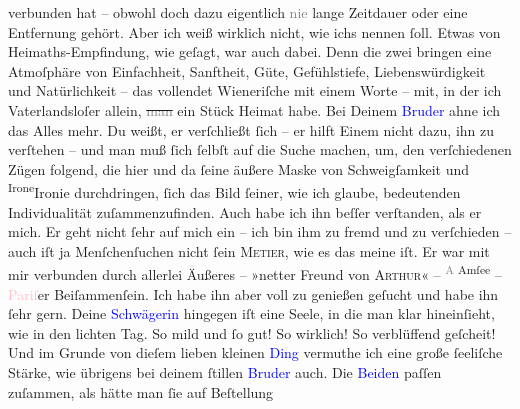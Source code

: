 \documentclass[twoside=false,titlepage=false,open=any, parskip=never, fontsize=12pt, headings=small, chapterprefix=false, appendixprefix=false]{scrbook}
\newcommand{\strikeout}[1]{\sout{#1}}
\newcommand{\Theight}{\dimexpr\fontcharht\font`W}
\newcommand{\pbposition}{\depth}
\newcommand{\pb}{\nobreak\hspace{0pt}\raisebox{-0.1em}{\raisebox{\pbposition}{\textnormal{|}}}\nobreak\hspace{0pt}}
\newcommand{\substVorne}{\textnormal{\raisebox{\Theight}{\raisebox{-\height}{\rotatebox[origin=c]{180}{v}\normalsize}}}}
\newcommand{\substDazwischen}{}
\newcommand{\substHinten}{\textnormal{\raisebox{\Theight}{\raisebox{-\height}{\small{v}\normalsize}}}}
\begin{document}
               verbunden hat – obwohl doch dazu eigentlich \textcolor{gray}{nie} lange Zeitdauer
               oder eine Entfernung gehört. Aber ich weiß wirklich nicht, wie ichs nennen ſoll.
               Etwas von Heimaths-Empfindung, wie geſagt, {\pb}war auch
               dabei. Denn die zwei bringen eine Atmoſphäre von Einfachheit, Sanftheit, Güte,
               Gefühlstiefe, Liebenswürdigkeit und Natürlichkeit – das vollendet Wieneriſche mit
               einem Worte – mit, in der ich Vaterlandsloſer allein, \strikeout{\textcolor{gray}{man}} ein Stück Heimat habe. Bei Deinem \textcolor{blue}{Bruder}{} ahne ich das Alles mehr.
               Du weißt, er verſchließt ſich – er hilft Einem nicht dazu, ihn zu verſtehen – und man
               muß ſich ſelbſt auf die Suche machen, um, den verſchiedenen Zügen folgend, die hier
               und da ſeine äußere Maske von Schweigſamkeit und \substVorne{}\textsuperscript{Irone}\substDazwischen{}Ironie\substHinten{} durchdringen, ſich {\pb}das Bild ſeiner, wie
               ich glaube, bedeutenden Individualität zuſammenzufinden. Auch habe ich ihn beſſer
               verſtanden, als er mich. Er geht nicht ſehr auf mich ein – ich bin ihm zu fremd und
               zu verſchieden – auch iſt ja Menſchenſuchen nicht ſein \textsc{Metier}, wie es das meine iſt. Er war mit mir verbunden durch allerlei
               Äußeres – »netter Freund von \textsc{Arthur}« – \substVorne{}\textsuperscript{\textcolor{gray}{A} Amſee}{\allowbreak}\substDazwischen{}\textcolor{pink}{\textsc{\label{K_L02608-1v}\label{K_L02608-1h}}}{}\ledrightnote{\textcolor{pink}{Almsee}}\substHinten{} – \textcolor{pink}{Pariſ}{}\ledrightnote{\textcolor{pink}{Paris}}er Beiſammenſein. Ich habe ihn aber
               voll zu genießen geſucht und habe ihn ſehr gern. Deine \textcolor{blue}{Schwägerin}{} hingegen iſt eine Seele, in die man klar
               hineinſieht, wie in den lichten Tag. So mild {\pb}und ſo
               gut! So wirklich! So verblüffend geſcheit! Und im Grunde von dieſem lieben kleinen
                  \textcolor{blue}{Ding}{} vermuthe ich eine große
               ſeeliſche Stärke, wie übrigens bei deinem ſtillen \textcolor{blue}{Bruder}{} auch. Die \textcolor{blue}{Beiden}{} paſſen zuſammen, als hätte man ſie auf Beſtellung
\end{document}

